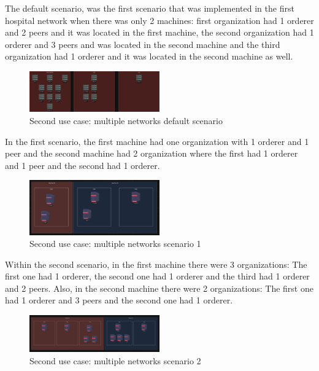 The default scenario, was the first scenario that was implemented in the first hospital network when there was only 2 machines: first organization had 1 orderer and 2 peers and it was located in the first machine, the second organization had 1 orderer and 3 peers and was located in the second machine and the third organization had 1 orderer and it was located in the second machine as well.

\begin{figure}[H]
    \centering
    \includegraphics[width=0.5\textwidth]{assets/use-case-2/default-first-netwrk.drawio.png} %
    \caption{Second use case: multiple networks default scenario}
    \label{fig:sample-image} 
\end{figure}

In the first scenario, the first machine had one organization with 1 orderer and 1 peer and the second machine had 2 organization where the first had 1 orderer and 1 peer and the second had 1 orderer.

\begin{figure}[H]
    \centering
    \includegraphics[width=0.5\textwidth]{assets/use-case-2/scenario1.png} %
    \caption{Second use case: multiple networks scenario 1}
    \label{fig:sample-image} 
\end{figure}

Within the second scenario, in the first machine there were 3 organizations: The first one had 1 orderer, the second one had 1 orderer and the third had 1 orderer and 2 peers. Also, in the second machine there were 2 organizations: The first one had 1 orderer and 3 peers and the second one had 1 orderer.

\begin{figure}[H]
    \centering
    \includegraphics[width=0.5\textwidth]{assets/use-case-2/scenario2.png} %
    \caption{Second use case: multiple networks scenario 2}
    \label{fig:sample-image} 
\end{figure}

